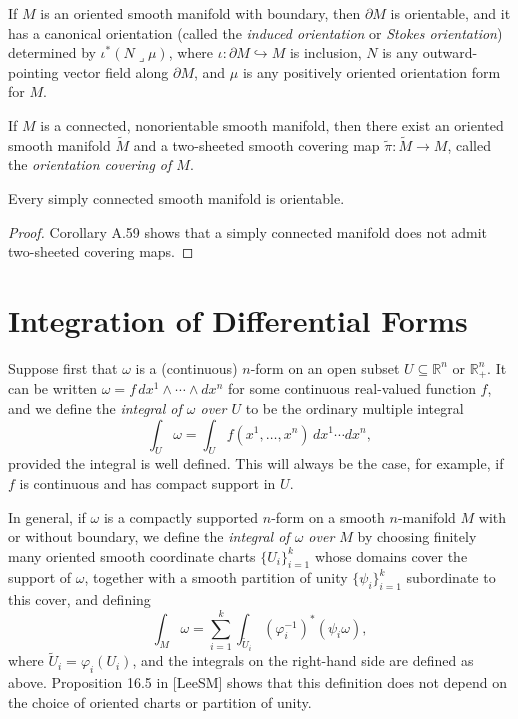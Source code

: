 \begin{proposition}
\label{prop:induced-orientation-boundary}
If $M$ is an oriented smooth manifold with boundary, then $\partial M$ is orientable, and it has a canonical orientation (called the \emph{induced orientation} or \emph{Stokes orientation}) determined by $\iota^*(N \lrcorner \mu)$, where $\iota: \partial M \hookrightarrow M$ is inclusion, $N$ is any outward-pointing vector field along $\partial M$, and $\mu$ is any positively oriented orientation form for $M$.
\end{proposition}

\begin{proposition}
\label{prop:orientation-covering-theorem}
If $M$ is a connected, nonorientable smooth manifold, then there exist an oriented smooth manifold $\tilde{M}$ and a two-sheeted smooth covering map $\tilde{\pi}: \tilde{M} \to M$, called the \emph{orientation covering of $M$}.
\end{proposition}

\begin{corollary}
\label{cor:simply-connected-orientable}

Every simply connected smooth manifold is orientable.
\end{corollary}

\begin{proof}
Corollary A.59 shows that a simply connected manifold does not admit two-sheeted covering maps.
\end{proof}

\section{Integration of Differential Forms}

Suppose first that $\omega$ is a (continuous) $n$-form on an open subset $U \subseteq \mathbb{R}^n$ or $\mathbb{R}^n_+$. It can be written $\omega = f \, dx^1 \wedge \cdots \wedge dx^n$ for some continuous real-valued function $f$, and we define the \emph{integral of $\omega$ over $U$} to be the ordinary multiple integral
\[
\int_U \omega = \int_U f(x^1,\ldots,x^n) \, dx^1 \cdots dx^n,
\]
provided the integral is well defined. This will always be the case, for example, if $f$ is continuous and has compact support in $U$.

In general, if $\omega$ is a compactly supported $n$-form on a smooth $n$-manifold $M$ with or without boundary, we define the \emph{integral of $\omega$ over $M$} by choosing finitely many oriented smooth coordinate charts $\{U_i\}_{i=1}^k$ whose domains cover the support of $\omega$, together with a smooth partition of unity $\{\psi_i\}_{i=1}^k$ subordinate to this cover, and defining
\[
\int_M \omega = \sum_{i=1}^k \int_{\tilde{U}_i} (\varphi_i^{-1})^*(\psi_i\omega),
\]
where $\tilde{U}_i = \varphi_i(U_i)$, and the integrals on the right-hand side are defined as above. Proposition 16.5 in [LeeSM] shows that this definition does not depend on the choice of oriented charts or partition of unity.

